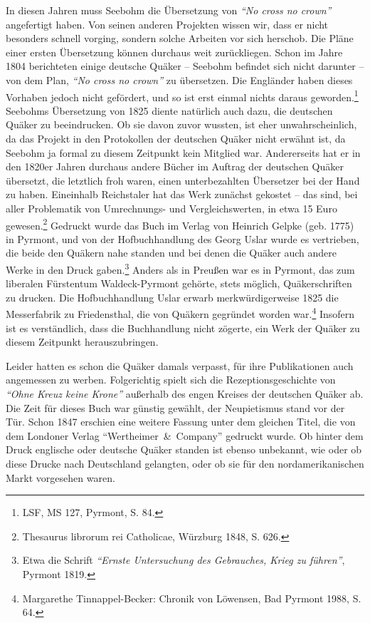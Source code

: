 In diesen Jahren muss Seebohm die Übersetzung von \textit{"`No cross no crown"'}
angefertigt haben. Von seinen anderen Projekten wissen wir, dass er nicht
besonders schnell vorging, sondern solche Arbeiten vor sich herschob. Die Pläne
einer ersten Übersetzung können durchaus weit zurückliegen. Schon im Jahre 1804
berichteten einige deutsche Quäker -- Seebohm befindet sich nicht darunter -- von
dem Plan, \textit{"`No cross no crown"'} zu übersetzen. Die Engländer haben dieses
Vorhaben jedoch nicht gefördert, und so ist erst einmal nichts daraus
geworden.\footnote{LSF, MS 127, Pyrmont, S. 84.} Seebohms Übersetzung von 1825
diente natürlich auch dazu, die deutschen Quäker zu beeindrucken. Ob sie davon
zuvor wussten, ist eher unwahrscheinlich, da das Projekt in den Protokollen der
deutschen Quäker nicht erwähnt ist, da Seebohm ja formal zu diesem Zeitpunkt
kein Mitglied war. Andererseits hat er in den 1820er Jahren durchaus andere
Bücher im Auftrag der deutschen Quäker übersetzt, die letztlich froh waren,
einen unterbezahlten Übersetzer bei der Hand zu haben. Eineinhalb Reichstaler
hat das Werk zunächst gekostet -- das sind, bei aller Problematik von
Umrechnungs- und Vergleichswerten, in etwa 15 Euro gewesen.\footnote{Thesaurus
librorum rei Catholicae, Würzburg 1848, S. 626.} Gedruckt wurde das Buch im
Verlag von Heinrich Gelpke (geb. 1775) in Pyrmont, und von der Hofbuchhandlung
des Georg Uslar wurde es vertrieben, die beide den Quäkern nahe standen und bei denen die
Quäker auch andere Werke in den Druck gaben.\footnote{Etwa die Schrift \textit{"`Ernste
Untersuchung des Gebrauches, Krieg zu führen"'},
Pyrmont 1819.} Anders als in Preußen war es in
Pyrmont, das zum liberalen Fürstentum Waldeck-Pyr\-mont gehörte, stets möglich,
Quäkerschriften zu drucken. Die Hofbuchhandlung Uslar erwarb merkwürdigerweise
1825 die Messerfabrik zu Friedensthal, die von Quäkern gegründet worden
war.\footnote{Margarethe Tinnappel-Becker: Chronik von Löwensen, Bad Pyrmont
1988, S. 64.} Insofern ist es verständlich, dass die Buchhandlung nicht zögerte,
ein Werk der Quäker zu diesem Zeitpunkt herauszubringen.

\medskip


Leider hatten es schon die Quäker damals verpasst, für ihre Publikationen auch
angemessen zu werben. Folgerichtig spielt sich die Rezeptionsgeschichte von
\textit{"`Ohne Kreuz keine Krone"'} außerhalb des engen Kreises der deutschen Quäker ab.
Die Zeit für dieses Buch war günstig gewählt, der Neupietismus  stand vor der
Tür. Schon 1847 erschien eine weitere Fassung unter dem gleichen Titel, die von
dem Londoner Verlag "`Wertheimer~\&~Company"' gedruckt wurde. Ob hinter dem
Druck englische oder deutsche Quäker standen ist ebenso unbekannt, wie oder ob
diese Drucke nach Deutschland gelangten, oder ob sie für den nordamerikanischen
Markt vorgesehen waren.

